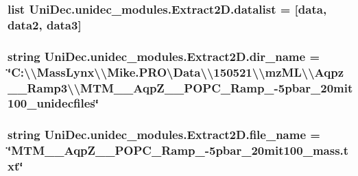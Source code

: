 \subsubsection[{datalist}]{\setlength{\rightskip}{0pt plus 5cm}list Uni\+Dec.\+unidec\+\_\+modules.\+Extract2\+D.\+datalist = \mbox{[}{\bf data}, {\bf data2}, {\bf data3}\mbox{]}}\label{namespace_uni_dec_1_1unidec__modules_1_1_extract2_d_afd604f25bfa553644a3b6016f99b0afa}
\hypertarget{namespace_uni_dec_1_1unidec__modules_1_1_extract2_d_ae4fa189fb1312a286a48ff9b8002148b}{}
\subsubsection[{dir\+\_\+name}]{\setlength{\rightskip}{0pt plus 5cm}string Uni\+Dec.\+unidec\+\_\+modules.\+Extract2\+D.\+dir\+\_\+name = \char`\"{}C\+:\textbackslash{}\textbackslash{}\+Mass\+Lynx\textbackslash{}\textbackslash{}\+Mike.\+P\+R\+O\textbackslash{}\+Data\textbackslash{}\textbackslash{}150521\textbackslash{}\textbackslash{}mz\+M\+L\textbackslash{}\textbackslash{}\+Aqpz\+\_\+\_\+\+Ramp3\textbackslash{}\textbackslash{}\+M\+T\+M\+\_\+\_\+\+Aqp\+Z\+\_\+\_\+\+P\+O\+P\+C\+\_\+\+Ramp\+\_-\/5pbar\+\_\+20mit100\+\_\+unidecfiles\char`\"{}}\label{namespace_uni_dec_1_1unidec__modules_1_1_extract2_d_ae4fa189fb1312a286a48ff9b8002148b}
\hypertarget{namespace_uni_dec_1_1unidec__modules_1_1_extract2_d_a11fa49d078dcdcfd6bb2a3b139f4bddc}{}
\subsubsection[{file\+\_\+name}]{\setlength{\rightskip}{0pt plus 5cm}string Uni\+Dec.\+unidec\+\_\+modules.\+Extract2\+D.\+file\+\_\+name = \char`\"{}M\+T\+M\+\_\+\_\+\+Aqp\+Z\+\_\+\_\+\+P\+O\+P\+C\+\_\+\+Ramp\+\_-\/5pbar\+\_\+20mit100\+\_\+mass.\+txt\char`\"{}}\label{namespace_uni_dec_1_1unidec__modules_1_1_extract2_d_a11fa49d078dcdcfd6bb2a3b139f4bddc}
\hypertarget{namespace_uni_dec_1_1unidec__modules_1_1_extract2_d_a82d38bf33b7bc117d5dfb661a8513458}{}

